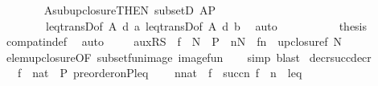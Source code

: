 \begin{isabellebody}
\ \ \ \ \ \ \isamarkupfalse%
\ A{\isacharunderscore}{\kern0pt}sub{\isacharunderscore}{\kern0pt}upclosure{\isacharbrackleft}{\kern0pt}THEN\ subsetD{\isacharbrackright}{\kern0pt}\ {\isacartoucheopen}A{\isasymsubseteq}P{\isacartoucheclose}\isanewline
\ \ \ \ \ \ \ \ leq{\isacharunderscore}{\kern0pt}transD{\isacharprime}{\kern0pt}{\isacharbrackleft}{\kern0pt}of\ A\ d\ a{\isacharbrackright}{\kern0pt}\ leq{\isacharunderscore}{\kern0pt}transD{\isacharprime}{\kern0pt}{\isacharbrackleft}{\kern0pt}of\ A\ d\ b{\isacharbrackright}{\kern0pt}\ \isamarkupfalse%
\ auto\isanewline
\ \ \ \ \isamarkupfalse%
\isanewline
\ \ \ \ \isamarkupfalse%
\ {\isacharquery}{\kern0pt}thesis\ \isamarkupfalse%
\ compat{\isacharunderscore}{\kern0pt}in{\isacharunderscore}{\kern0pt}def\ \isamarkupfalse%
\ auto\isanewline
\ \ \isamarkupfalse%
\isanewline
{}\isamarkupfalse%
%
\endisatagproof
{\isafoldproof}%
%
\isadelimproof
\isanewline
%
\endisadelimproof
\isanewline
{}\isamarkupfalse%
\ \ aux{\isacharunderscore}{\kern0pt}RS{}{\isacharcolon}{\kern0pt}\ \ {\isachardoublequoteopen}f\ {\isasymin}\ N\ {\isasymrightarrow}\ P\ {\isasymLongrightarrow}\ n{\isasymin}N\ {\isasymLongrightarrow}\ f{\isacharbackquote}{\kern0pt}n\ {\isasymin}\ upclosure{\isacharparenleft}{\kern0pt}f\ {\isacharbackquote}{\kern0pt}{\isacharbackquote}{\kern0pt}N{\isacharparenright}{\kern0pt}{\isachardoublequoteclose}\isanewline
%
\isadelimproof
\ \ %
\endisadelimproof
%
\isatagproof
{}\isamarkupfalse%
\ elem{\isacharunderscore}{\kern0pt}upclosure{\isacharbrackleft}{\kern0pt}OF\ subset{\isacharunderscore}{\kern0pt}fun{\isacharunderscore}{\kern0pt}image{\isacharbrackright}{\kern0pt}\ image{\isacharunderscore}{\kern0pt}fun\isanewline
\ \ \isamarkupfalse%
\ {\isacharparenleft}{\kern0pt}simp{\isacharcomma}{\kern0pt}\ blast{\isacharparenright}{\kern0pt}%
\endisatagproof
{\isafoldproof}%
%
\isadelimproof
\isanewline
%
\endisadelimproof
\isanewline
{}\isamarkupfalse%
\ decr{\isacharunderscore}{\kern0pt}succ{\isacharunderscore}{\kern0pt}decr{\isacharcolon}{\kern0pt}\ \isanewline
\ \ \ {\isachardoublequoteopen}f\ {\isasymin}\ nat\ {\isasymrightarrow}\ P{\isachardoublequoteclose}\ {\isachardoublequoteopen}preorder{\isacharunderscore}{\kern0pt}on{\isacharparenleft}{\kern0pt}P{\isacharcomma}{\kern0pt}leq{\isacharparenright}{\kern0pt}{\isachardoublequoteclose}\isanewline
\ \ \ \ {\isachardoublequoteopen}{\isasymforall}n{\isasymin}nat{\isachardot}{\kern0pt}\ \ {\isasymlangle}f\ {\isacharbackquote}{\kern0pt}\ succ{\isacharparenleft}{\kern0pt}n{\isacharparenright}{\kern0pt}{\isacharcomma}{\kern0pt}\ f\ {\isacharbackquote}{\kern0pt}\ n{\isasymrangle}\ {\isasymin}\ leq{\isachardoublequoteclose}\isanewline

\end{isabellebody}
